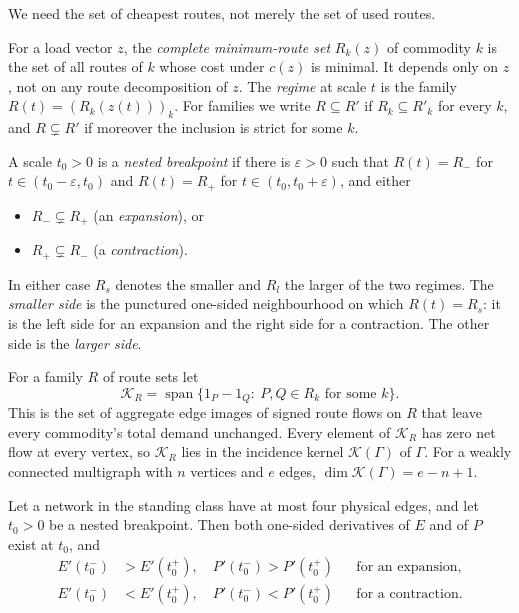 We need the set of cheapest routes, not merely the set of used routes.

\begin{definition}\label{def:regimeB}
For a load vector $z$, the \emph{complete minimum-route set} $R_k(z)$ of
commodity $k$ is the set of all routes of $k$ whose cost under $c(z)$ is
minimal. It depends only on $z$, not on any route decomposition of $z$. The
\emph{regime} at scale $t$ is the family $R(t)=(R_k(z(t)))_k$. For families we
write $R\subseteq R'$ if $R_k\subseteq R'_k$ for every $k$, and
$R\subsetneq R'$ if moreover the inclusion is strict for some $k$.

A scale $t_0>0$ is a \emph{nested breakpoint} if there is $\varepsilon>0$ such
that $R(t)=R_-$ for $t\in(t_0-\varepsilon,t_0)$ and $R(t)=R_+$ for
$t\in(t_0,t_0+\varepsilon)$, and either
\begin{itemize}
\item $R_-\subsetneq R_+$ (an \emph{expansion}), or
\item $R_+\subsetneq R_-$ (a \emph{contraction}).
\end{itemize}
In either case $R_s$ denotes the smaller and $R_l$ the larger of the two
regimes. The \emph{smaller side} is the punctured one-sided neighbourhood on
which $R(t)=R_s$: it is the left side for an expansion and the right side for
a contraction. The other side is the \emph{larger side}.
\end{definition}

For a family $R$ of route sets let
\[
 \mathcal K_R=\operatorname{span}\{1_P-1_Q:\ P,Q\in R_k\text{ for some }k\}.
\]
This is the set of aggregate edge images of signed route flows on $R$ that
leave every commodity's total demand unchanged. Every element of
$\mathcal K_R$ has zero net flow at every vertex, so $\mathcal K_R$ lies in
the incidence kernel $\mathcal K(\Gamma)$ of $\Gamma$. For a weakly connected
multigraph with $n$ vertices and $e$ edges, $\dim\mathcal K(\Gamma)=e-n+1$.

\begin{theorem}\label{thm:fouredge}
Let a network in the standing class have at most four physical edges, and
let $t_0>0$ be a nested breakpoint. Then both one-sided derivatives of $E$
and of $P$ exist at $t_0$, and
\begin{align*}
 E'(t_0^-)&>E'(t_0^+),\quad P'(t_0^-)>P'(t_0^+)
 &&\text{for an expansion},\\
 E'(t_0^-)&<E'(t_0^+),\quad P'(t_0^-)<P'(t_0^+)
 &&\text{for a contraction}.
\end{align*}
\end{theorem}

